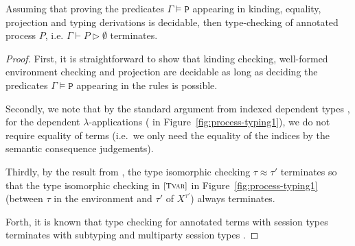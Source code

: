 \documentclass{LMCS}
\newcommand{\tftrule}[1]{{\text{\footnotesize[\text{\sc{#1}}]}}}
\newcommand{\PRED}{\ensuremath{\mathtt{P}}}
\newcommand{\proves}{\vdash}                        \newcommand{\judg}{{J}}
\newcommand{\WB}{\approx}
\begin{document}
\begin{thm}
\label{thm:termination}
Assuming that proving the 
predicates $\Gamma\models \PRED$ appearing in kinding, 
equality, projection and typing derivations  
is decidable, 
then type-checking of annotated process $P$, i.e. 
$\Gamma\proves P\rhd \emptyset$ terminates. 
\end{thm}
\begin{proof} 
First, it is straightforward to show that 
kinding checking, well-formed environment checking and 
projection are decidable 
as long as deciding the predicates
$\Gamma\models \PRED$ appearing in the rules 
is possible. 

Secondly, we note that by the standard argument from indexed dependent types 
\cite{DependentBook,DBLP:conf/popl/XiP99}, 
for the dependent $\lambda$-applications (\tftrule{TApp} in Figure~\ref{fig:process-typing1}), we do not require 
equality of terms (i.e.~we only need the equality 
of the indices by the semantic consequence judgements). 

Thirdly, by the result from \cite[Corollary 2, page 217]{GH05}, 
the type isomorphic checking $\tau \WB \tau'$ terminates so that 
the type isomorphic checking 
in $\tftrule{Tvar}$ in Figure~\ref{fig:process-typing1} 
(between $\tau$ in the environment and 
$\tau'$ of $X^{\tau'}$) always terminates. 

Forth, it is known that type checking for annotated 
terms with session types terminates with subtyping 
\cite[\S~5.2]{GH05} and multiparty session types \cite{CHY07}. 


\end{proof}
\end{document}
